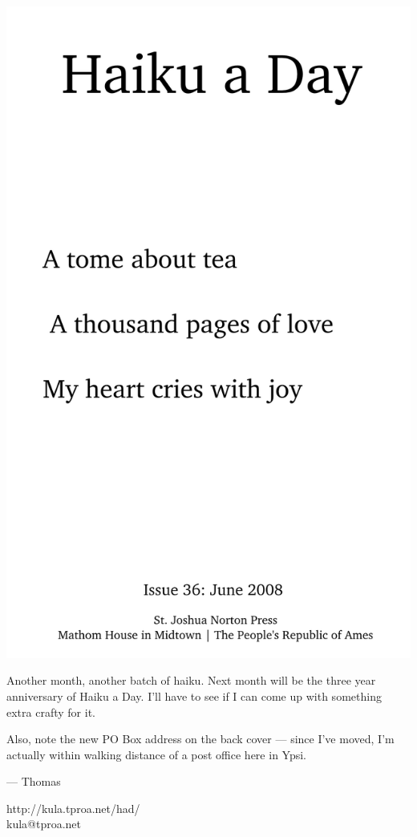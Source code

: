 \documentclass[12pt]{article}
\begin{document}
\includegraphics{frontpage.png}

\newpage

Another month, another batch of haiku. Next month
will be the three year anniversary of Haiku a Day.
I'll have to see if I can come up with something 
extra crafty for it.

Also, note the new PO Box address on the back cover
--- since I've moved, I'm actually within walking
distance of a post office here in Ypsi.

--- Thomas

http://kula.tproa.net/had/ \\
kula@tproa.net
\end{document}
